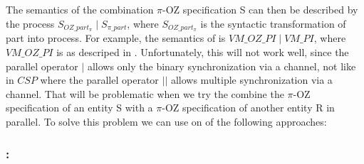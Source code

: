The semantics of the combination $\pi$-OZ specification S can then be described by the \picalc{} process $S_{OZ\_part_\pi} \mid S_{\pi\_part}$, where $S_{OZ\_part_\pi}$ is the syntactic transformation of \oz{} part into \picalc{} process. For example, the semantics of  is $VM\_OZ\_PI \mid VM\_PI$, where $VM\_OZ\_PI$ is as descriped in . Unfortunately, this will not work well, since the parallel operator $|$ allows only the binary synchronization via a channel, not like in $CSP$ where the parallel operator $||$ allows multiple synchronization via a channel. That will be problematic when we try the combine the $\pi$-OZ specification of an entity S with a $\pi$-OZ specification of another entity R in parallel. To solve this problem we can use on of the following approaches:

\subsubsection{}
\subsubsection{:}
